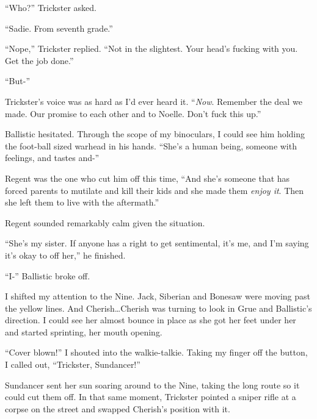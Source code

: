 ``Who?'' Trickster asked.



``Sadie.  From seventh grade.''



``Nope,'' Trickster replied.  ``Not in the slightest.  Your head's fucking with you.  Get the job done.''



``But-''



Trickster's voice was as hard as I'd ever heard it.  ``\emph{Now}.  Remember the deal we made.  Our promise to each other and to Noelle.  Don't fuck this up.''



Ballistic hesitated.  Through the scope of my binoculars, I could see him holding the foot-ball sized warhead in his hands.  ``She's a human being, someone with feelings, and tastes and-''



Regent was the one who cut him off this time, ``And she's someone that has forced parents to mutilate and kill their kids and she made them \emph{enjoy it}.  Then she left them to live with the aftermath.''



Regent sounded remarkably calm given the situation.



``She's my sister.  If anyone has a right to get sentimental, it's me, and I'm saying it's okay to off her,'' he finished.



``I-''  Ballistic broke off.



I shifted my attention to the Nine.  Jack, Siberian and Bonesaw were moving past the yellow lines.  And Cherish\ldots Cherish was turning to look in Grue and Ballistic's direction.  I could see her almost bounce in place as she got her feet under her and started sprinting, her mouth opening.



``Cover blown!'' I shouted into the walkie-talkie.  Taking my finger off the button, I called out,  ``Trickster, Sundancer!''



Sundancer sent her sun soaring around to the Nine, taking the long route so it could cut them off.  In that same moment, Trickster pointed a sniper rifle at a corpse on the street and swapped Cherish's position with it.



